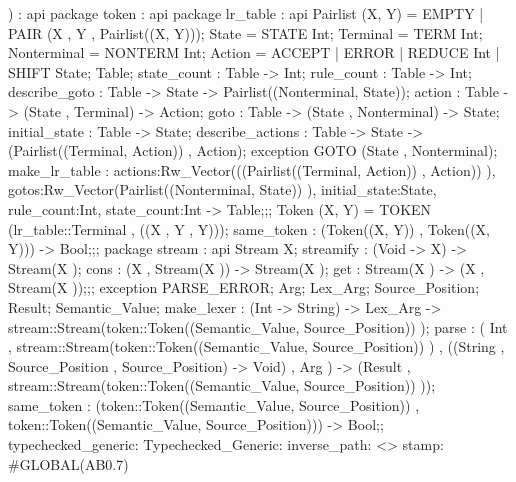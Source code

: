 )
:
api {   package token
          : api {   package lr_table
                      : api {
                            Pairlist (X, Y) = EMPTY | PAIR (X , Y , Pairlist((X, Y)));
                            State  = STATE Int;
                            Terminal  = TERM Int;
                            Nonterminal  = NONTERM Int;
                            Action  = ACCEPT | ERROR | REDUCE Int | SHIFT State;
                            Table;
                            state_count : Table -> Int;
                            rule_count : Table -> Int;
                            describe_goto : Table -> State -> Pairlist((Nonterminal, State));
                            action : Table -> (State , Terminal) -> Action;
                            goto : Table -> (State , Nonterminal) -> State;
                            initial_state : Table -> State;
                            describe_actions : Table -> State -> (Pairlist((Terminal, Action)) , Action);
                            exception GOTO (State , Nonterminal);
                                make_lr_table :
                                        {actions:Rw_Vector(((Pairlist((Terminal, Action)) , Action)) ),
                                        gotos:Rw_Vector(Pairlist((Nonterminal, State)) ), initial_state:State, rule_count:Int,
                                        state_count:Int}
                                    ->
                                    Table;};;
                Token (X, Y) = TOKEN (lr_table::Terminal , ((X , Y , Y)));
                same_token : (Token((X, Y)) , Token((X, Y))) -> Bool;};;
        package stream
          : api {
                Stream X;
                streamify : (Void -> X) -> Stream(X );
                cons : (X , Stream(X )) -> Stream(X );
                get : Stream(X ) -> (X , Stream(X ));};;
    exception PARSE_ERROR;
    Arg;
    Lex_Arg;
    Source_Position;
    Result;
    Semantic_Value;
        make_lexer :
        (Int -> String) -> Lex_Arg -> stream::Stream(token::Token((Semantic_Value, Source_Position)) );
        parse :
            (   Int , stream::Stream(token::Token((Semantic_Value, Source_Position)) ) ,
                ((String , Source_Position , Source_Position) -> Void) , Arg
            )
            ->
            (Result , stream::Stream(token::Token((Semantic_Value, Source_Position)) ));
        same_token :
            (token::Token((Semantic_Value, Source_Position)) , token::Token((Semantic_Value, Source_Position)))
            ->
            Bool;};
typechecked_generic:
Typechecked_Generic:
inverse_path: <>
stamp: #GLOBAL(AB0.7)
